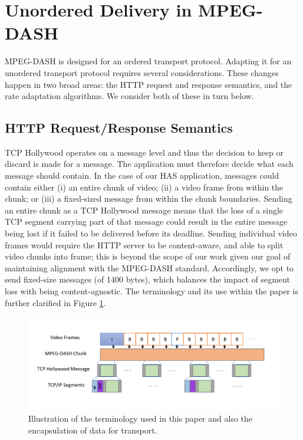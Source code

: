 \section{Unordered Delivery in MPEG-DASH}
\label{sec:transport}

MPEG-DASH is designed for an ordered transport protocol. Adapting it for an
unordered transport protocol requires several considerations. These
changes happen in two broad areas: the HTTP request and response semantics, and the rate
adaptation algorithms. We consider both of these in turn below.

\subsection{HTTP Request/Response Semantics}

TCP Hollywood operates on a message level and thus the decision to keep or discard is made
for a message. The application must therefore decide what each message should contain. In
the case of our HAS application, messages could contain either (i) an entire chunk of video; 
(ii) a video frame from within the chunk; or (iii) a fixed-sized message from within the 
chunk boundaries.  Sending an entire chunk as a TCP Hollywood
message means that the loss of a single TCP segment carrying part of that message could result in
the entire message being lost if it failed to be delivered before its deadline. Sending 
individual video frames would require the HTTP server to be content-aware, and able to 
split video chunks into frame; this is beyond the scope of our work given our goal of
maintaining alignment with the MPEG-DASH standard. Accordingly, we opt to send fixed-size 
messages (of 1400 bytes), which balances the impact of segment loss with being content-agnostic. 
The terminology and its use within the paper is further clarified in Figure \ref{fig:terminology}.

\begin{figure}
  \centering
  \includegraphics[width=\columnwidth]{figures/terminology2.pdf}
  \caption{Illustration of the terminology used in this paper and also the encapsulation of data for transport.}
  \label{fig:terminology}
\end{figure}


